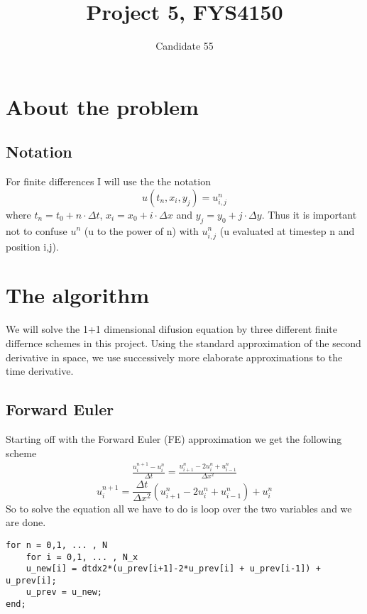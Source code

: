 \documentclass[a4paper,english, 10pt, twoside]{article}
\title{Project 5, FYS4150}
\author{Candidate 55}
\begin{document}
\maketitle
\tableofcontents

\section{About the problem}

\subsection{Notation}
For finite differences I will use the the notation 
\begin{equation*}
 u(t_n,x_i,y_j) = u^n_{i,j}
\end{equation*}
where $t_n = t_0 + n\cdot\Delta t$, $x_i = x_0 +i\cdot\Delta x$ and $y_j = y_0 +j\cdot\Delta y$. Thus it is important not to 
confuse $u^n$ (u to the power of n) with $u^n_{i,j}$ (u evaluated at timestep n and position i,j).
\section{The algorithm}
We will solve the 1+1 dimensional difusion equation by three different finite differnce schemes in this project. Using the 
standard approximation of the second derivative in space, we use successively more elaborate approximations to the time derivative. 
\subsection{Forward Euler}
Starting off with the Forward Euler (FE) approximation we get the following scheme
\begin{align*}
 \frac{u^{n+1}_i-u^n_i}{\Delta t} = \frac{u^n_{i+1}-2u^n_i + u^n_{i-1}}{\Delta x^2}
\end{align*}
\begin{equation}\label{FE}
 u^{n+1}_i = \frac{\Delta t}{\Delta x^2}\left(u^n_{i+1}-2u^n_i + u^n_{i-1}\right) +u^n_i
\end{equation}
So to solve the equation all we have to do is loop over the two variables and we are done.\\
\begin{lstlisting}
for n = 0,1, ... , N
    for i = 0,1, ... , N_x
	u_new[i] = dtdx2*(u_prev[i+1]-2*u_prev[i] + u_prev[i-1]) + u_prev[i];
    u_prev = u_new;
end;
\end{lstlisting}
\end{document}
